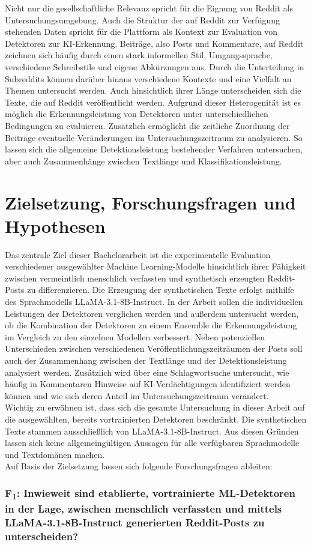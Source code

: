 Nicht nur die gesellschaftliche Relevanz spricht für die Eignung von Reddit als Untersuchungsumgebung. Auch die Struktur der auf Reddit zur Verfügung stehenden Daten spricht für die Plattform als Kontext zur Evaluation von Detektoren zur KI-Erkennung. Beiträge, also Posts und Kommentare, auf Reddit zeichnen sich häufig durch einen stark informellen Stil, Umgangssprache, verschiedene Schreibstile und eigene Abkürzungen aus. Durch die Unterteilung in Subreddits können darüber hinaus verschiedene Kontexte und eine Vielfalt an Themen untersucht werden. Auch hinsichtlich ihrer Länge unterscheiden sich die Texte, die auf Reddit veröffentlicht werden. Aufgrund dieser Heterogenität ist es möglich die Erkennungsleistung von Detektoren unter unterschiedlichen Bedingungen zu evaluieren. Zusätzlich ermöglicht die zeitliche Zuordnung der Beiträge eventuelle Veränderungen im Untersuchungszeitraum zu analysieren. So lassen sich die allgemeine Detektionsleistung bestehender Verfahren untersuchen, aber auch Zusammenhänge zwischen Textlänge und Klassifikationsleistung.\\


\section{Zielsetzung, Forschungsfragen und Hypothesen}
Das zentrale Ziel dieser Bachelorarbeit ist die experimentelle Evaluation verschiedener ausgewählter Machine Learning-Modelle hinsichtlich ihrer Fähigkeit zwischen vermeintlich menschlich verfassten und synthetisch erzeugten Reddit-Posts zu differenzieren. Die Erzeugung der synthetischen Texte erfolgt mithilfe des Sprachmodells LLaMA-3.1-8B-Instruct. In der Arbeit sollen die individuellen Leistungen der Detektoren verglichen werden und außerdem untersucht werden, ob die Kombination der Detektoren zu einem Ensemble die Erkennungsleistung im Vergleich zu den einzelnen Modellen verbessert. Neben potenziellen Unterschieden zwischen verschiedenen Veröffentlichungszeiträumen der Posts soll auch der Zusammenhang zwischen der Textlänge und der Detektionsleistung analysiert werden. Zusätzlich wird über eine Schlagwortsuche untersucht, wie häufig in Kommentaren Hinweise auf KI-Verdächtigungen identifiziert werden können und wie sich deren Anteil im Untersuchungszeitraum verändert. \\
Wichtig zu erwähnen ist, dass sich die gesamte Untersuchung in dieser Arbeit auf die ausgewählten, bereits vortrainierten Detektoren beschränkt. Die synthetischen Texte stammen ausschließlich von LLaMA-3.1-8B-Instruct. Aus diesen Gründen lassen sich keine allgemeingültigen Aussagen für alle verfügbaren Sprachmodelle und Textdomänen machen. \\
Auf Basis der Zielsetzung lassen sich folgende Forschungsfragen ableiten:
\hypertarget{rq:1}{
    \subsubsection{F\textsubscript{1}: Inwieweit sind etablierte, vortrainierte ML-Detektoren in der Lage, zwischen menschlich verfassten und mittels LLaMA-3.1-8B-Instruct generierten Reddit-Posts zu unterscheiden?}
}

